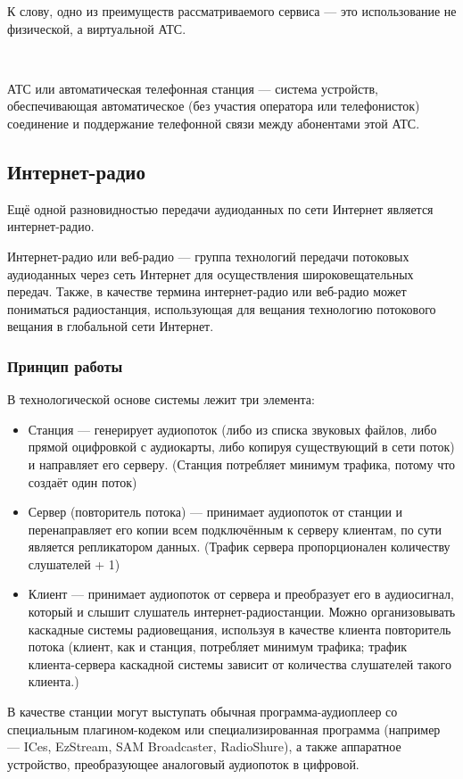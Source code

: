 \documentclass[a4paper]{report}
\begin{document}
К слову, одно из преимуществ рассматриваемого сервиса — это использование не физической, а виртуальной АТС.

~

АТС или автоматическая телефонная станция  — система устройств, обеспечивающая автоматическое (без участия оператора или телефонисток) соединение и поддержание телефонной связи между абонентами этой АТС.

\subsection{Интернет-радио}
Ещё одной разновидностью передачи аудиоданных по сети Интернет является интернет-радио.

Интернет-радио или веб-радио — группа технологий передачи потоковых аудиоданных через сеть Интернет для осуществления широковещательных передач. Также, в качестве термина интернет-радио или веб-радио может пониматься радиостанция, использующая для вещания технологию потокового вещания в глобальной сети Интернет.

\subsubsection{Принцип работы}
В технологической основе системы лежит три элемента:
\begin{itemize}
\item Станция — генерирует аудиопоток (либо из списка звуковых файлов, либо прямой оцифровкой с аудиокарты, либо копируя существующий в сети поток) и направляет его серверу. (Станция потребляет минимум трафика, потому что создаёт один поток)
\item Сервер (повторитель потока) — принимает аудиопоток от станции и перенаправляет его копии всем подключённым к серверу клиентам, по сути является репликатором данных. (Трафик сервера пропорционален количеству слушателей + 1)
\item Клиент — принимает аудиопоток от сервера и преобразует его в аудиосигнал, который и слышит слушатель интернет-радиостанции. Можно организовывать каскадные системы радиовещания, используя в качестве клиента повторитель потока (клиент, как и станция, потребляет минимум трафика; трафик клиента-сервера каскадной системы зависит от количества слушателей такого клиента.)
\end{itemize}

В качестве станции могут выступать обычная программа-аудиоплеер со специальным плагином-кодеком или специализированная программа (например — ICes, EzStream, SAM Broadcaster, RadioShure), а также аппаратное устройство, преобразующее аналоговый аудиопоток в цифровой.
\end{document}

